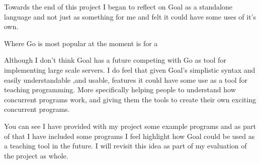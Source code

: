 Towards the end of this project I began to reflect on Goal as a standalone language and not just as something for me and felt it could have some uses of it's own.

Where Go is most popular at the moment is for a 

Although I don't think Goal has a future competing with Go as tool for implementing large scale servers. I do feel that given Goal's simplistic syntax and easily understandable ,and usable, features it could have some use as a tool for teaching programming. More specifically helping people to understand how concurrent programs work, and giving them the tools to create their own exciting concurrent programs.

You can see I have provided with my project some example programs and as part of that I have included some programs I feel highlight how Goal could be used as a teaching tool in the future. I will revisit this idea as part of my evaluation of the project as whole.    
